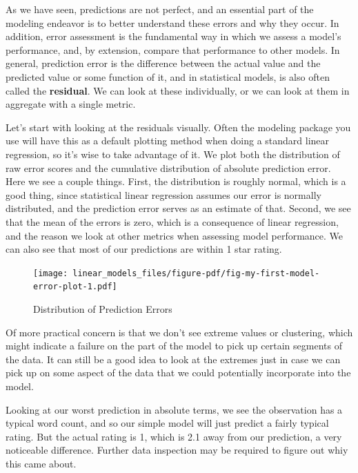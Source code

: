 \documentclass[
  letterpaper,
]{krantz}
\begin{document}
As we have seen, predictions are not perfect, and an essential part of
the modeling endeavor is to better understand these errors and why they
occur. In addition, error assessment is the fundamental way in which we
assess a model's performance, and, by extension, compare that
performance to other models. In general, prediction error is the
difference between the actual value and the predicted value or some
function of it, and in statistical models, is also often called the
\textbf{residual}. We can look at these individually, or we can look at
them in aggregate with a single metric.

Let's start with looking at the residuals visually. Often the modeling
package you use will have this as a default plotting method when doing a
standard linear regression, so it's wise to take advantage of it. We
plot both the distribution of raw error scores and the cumulative
distribution of absolute prediction error. Here we see a couple things.
First, the distribution is roughly normal, which is a good thing, since
statistical linear regression assumes our error is normally distributed,
and the prediction error serves as an estimate of that. Second, we see
that the mean of the errors is zero, which is a consequence of linear
regression, and the reason we look at other metrics when assessing model
performance. We can also see that most of our predictions are within 1
star rating.

\begin{figure}

{\centering \texttt{[image: linear\_models\_files/figure-pdf/fig-my-first-model-error-plot-1.pdf]}

}

\caption{\label{fig-my-first-model-error-plot}Distribution of Prediction
Errors}

\end{figure}

Of more practical concern is that we don't see extreme values or
clustering, which might indicate a failure on the part of the model to
pick up certain segments of the data. It can still be a good idea to
look at the extremes just in case we can pick up on some aspect of the
data that we could potentially incorporate into the model.

Looking at our worst prediction in absolute terms, we see the
observation has a typical word count, and so our simple model will just
predict a fairly typical rating. But the actual rating is 1, which is
2.1 away from our prediction, a very noticeable difference. Further data
inspection may be required to figure out whiy this came about.
\end{document}
